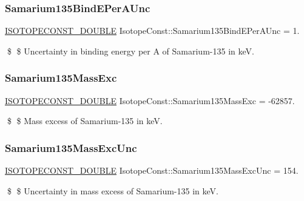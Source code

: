 \subsubsection{\texorpdfstring{Samarium135\+Bind\+E\+Per\+A\+Unc}{Samarium135BindEPerAUnc}}
{\footnotesize\ttfamily \mbox{\hyperlink{group___isotope_const-_macros_ga8f45a7272ce02c0b4c65c44636ed719a}{I\+S\+O\+T\+O\+P\+E\+C\+O\+N\+S\+T\+\_\+\+D\+O\+U\+B\+LE}} Isotope\+Const\+::\+Samarium135\+Bind\+E\+Per\+A\+Unc = 1.}

\$ \$ Uncertainty in binding energy per A of Samarium-\/135 in keV. \mbox{\label{group___isotope_const-_samarium-_sm135_gad7168987f5d779c0209cc9bbc9bd40ca}} 
\subsubsection{\texorpdfstring{Samarium135\+Mass\+Exc}{Samarium135MassExc}}
{\footnotesize\ttfamily \mbox{\hyperlink{group___isotope_const-_macros_ga8f45a7272ce02c0b4c65c44636ed719a}{I\+S\+O\+T\+O\+P\+E\+C\+O\+N\+S\+T\+\_\+\+D\+O\+U\+B\+LE}} Isotope\+Const\+::\+Samarium135\+Mass\+Exc = -\/62857.}

\$ \$ Mass excess of Samarium-\/135 in keV. \mbox{\label{group___isotope_const-_samarium-_sm135_gabf9c09e6d0c9be968453e156c7b39833}} 
\subsubsection{\texorpdfstring{Samarium135\+Mass\+Exc\+Unc}{Samarium135MassExcUnc}}
{\footnotesize\ttfamily \mbox{\hyperlink{group___isotope_const-_macros_ga8f45a7272ce02c0b4c65c44636ed719a}{I\+S\+O\+T\+O\+P\+E\+C\+O\+N\+S\+T\+\_\+\+D\+O\+U\+B\+LE}} Isotope\+Const\+::\+Samarium135\+Mass\+Exc\+Unc = 154.}

\$ \$ Uncertainty in mass excess of Samarium-\/135 in keV. \mbox{\label{group___isotope_const-_samarium-_sm135_ga9653c73208477b05ae07beddb37fcee4}} 
